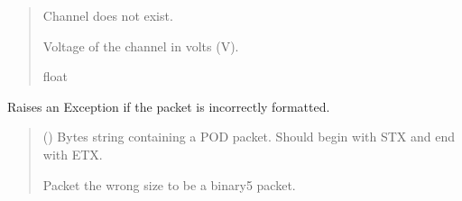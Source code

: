 \documentclass[letterpaper,10pt,english]{sphinxmanual}
\begin{document}
\begin{fulllineitems}
\begin{fulllineitems}
\begin{quote}
\begin{description}
\sphinxAtStartPar
{} \textendash{} Channel does not exist.

\sphinxAtStartPar
Voltage of the channel in volts (V).

\sphinxAtStartPar
float

\end{description}\end{quote}

\end{fulllineitems}


\begin{fulllineitems}
\label{\detokenize{Morelia.Packets:Morelia.Packets.Binary5.PacketBinary5.CheckIfPacketIsValid}}
\pysigstartsignatures
{}
\pysigstopsignatures
\sphinxAtStartPar
Raises an Exception if the packet is incorrectly formatted.
\begin{quote}\begin{description}
\sphinxAtStartPar
{} () \textendash{} Bytes string containing a POD packet. Should begin with STX                 and end with ETX.

\sphinxAtStartPar
{} \textendash{} Packet the wrong size to be a binary5 packet.

\end{description}\end{quote}

\end{fulllineitems}



\end{fulllineitems}
\end{document}
